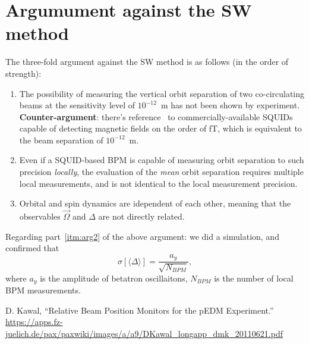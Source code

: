 \documentclass[12pt]{elsarticle}
\newcommand{\avg}[1]{\langle{#1}\rangle}
\begin{document}
\section{Argumument against the SW method}
The three-fold argument against the SW method is as follows (in the order of strength):
\begin{enumerate}[(1)]
\item The possibility of measuring the vertical orbit separation of two co-circulating beams
  at the sensitivity level of $10^{-12}$~m has not been shown by experiment.
  \textbf{Counter-argument}: there's reference~\cite{Kawal} to commercially-available SQUIDs
  capable of detecting magnetic fields on the order of fT, which is equivalent to the beam separation
  of $10^{-12}$~m. \label{itm:arg1}
\item Even if a SQUID-based BPM is capable of measuring orbit separation to such precision \emph{locally}, the
  evaluation of the \emph{mean} orbit separation requires multiple local measurements,
  and is not identical to the local measurement precision.\label{itm:arg2}
\item Orbital and spin dynamics are idependent of each other, meaning that the observables
  $\vec\Omega$ and $\Delta$ are not directly related.\label{itm:arg2}
\end{enumerate}

Regarding part~\ref{itm:arg2} of the above argument: we did a simulation, and confirmed that
\[
\sigma[\avg{\Delta}] = \frac{a_y}{\sqrt{N_{BPM}}},
\]
where $a_y$ is the amplitude of betatron oscillaitons, $N_{BPM}$ is the number of local BPM measurements.


\begin{thebibliography}{0}
  D. Kawal, ``Relative Beam Position Monitors for the pEDM Experiment.''
  \url{https://apps.fz-juelich.de/pax/paxwiki/images/a/a9/DKawal_longapp_dmk_20110621.pdf}
\end{thebibliography}
\end{document}
